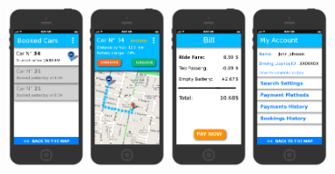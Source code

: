\documentclass[11pt]{article} %
\begin{document}
\begin{figure}[H]
	\includegraphics[width=0.2\textwidth]{../mockup/5CarBookedList.png}
	\includegraphics[width=0.2\textwidth]{../mockup/6CarBookedSelected.png}
	\includegraphics[width=0.2\textwidth]{../mockup/8Bill.png} 	\hspace{0.8cm}
	\includegraphics[width=0.2\textwidth]{../mockup/9MyAccount.png} 	\hspace{0.8cm}

\end{figure}
\end{document}

